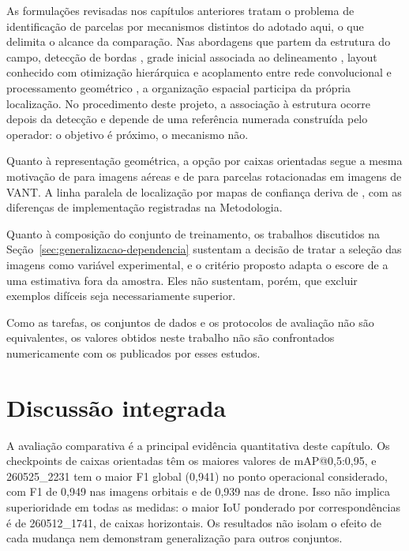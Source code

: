 As formula\c{c}\~oes revisadas nos cap\'itulos anteriores tratam o problema de identifica\c{c}\~ao de parcelas por mecanismos distintos do adotado aqui, o que delimita o alcance da compara\c{c}\~ao. Nas abordagens que partem da estrutura do campo, detec\c{c}\~ao de bordas \citep{robb2020}, grade inicial associada ao delineamento \citep{khan2019}, layout conhecido com otimiza\c{c}\~ao hier\'arquica \citep{mardanisamani2021} e acoplamento entre rede convolucional e processamento geom\'etrico \citep{han2024}, a organiza\c{c}\~ao espacial participa da pr\'opria localiza\c{c}\~ao. No procedimento deste projeto, a associa\c{c}\~ao \`a estrutura ocorre depois da detec\c{c}\~ao e depende de uma refer\^encia numerada constru\'ida pelo operador: o objetivo \'e pr\'oximo, o mecanismo n\~ao.

Quanto \`a representa\c{c}\~ao geom\'etrica, a op\c{c}\~ao por caixas orientadas segue a mesma motiva\c{c}\~ao de \citet{ding2019} para imagens a\'ereas e de \citet{zhang2025} para parcelas rotacionadas em imagens de VANT. A linha paralela de localiza\c{c}\~ao por mapas de confian\c{c}a deriva de \citet{arruda2022}, com as diferen\c{c}as de implementa\c{c}\~ao registradas na Metodologia.

Quanto \`a composi\c{c}\~ao do conjunto de treinamento, os trabalhos discutidos na Se\c{c}\~ao~\ref{sec:generalizacao-dependencia} sustentam a decis\~ao de tratar a sele\c{c}\~ao das imagens como vari\'avel experimental, e o crit\'erio proposto adapta o escore de \citet{yagi2025} a uma estimativa fora da amostra. Eles n\~ao sustentam, por\'em, que excluir exemplos dif\'iceis seja necessariamente superior.

Como as tarefas, os conjuntos de dados e os protocolos de avalia\c{c}\~ao n\~ao s\~ao equivalentes, os valores obtidos neste trabalho n\~ao s\~ao confrontados numericamente com os publicados por esses estudos.

\section{Discuss\~ao integrada}
\label{sec:discussao-integrada}

A avalia\c{c}\~ao comparativa \'e a principal evid\^encia quantitativa deste cap\'itulo. Os checkpoints de caixas orientadas t\^em os maiores valores de mAP@0,5:0,95, e 260525\_2231 tem o maior F1 global (0,941) no ponto operacional considerado, com F1 de 0,949 nas imagens orbitais e de 0,939 nas de drone. Isso n\~ao implica superioridade em todas as medidas: o maior IoU ponderado por correspond\^encias \'e de 260512\_1741, de caixas horizontais. Os resultados n\~ao isolam o efeito de cada mudan\c{c}a nem demonstram generaliza\c{c}\~ao para outros conjuntos.

